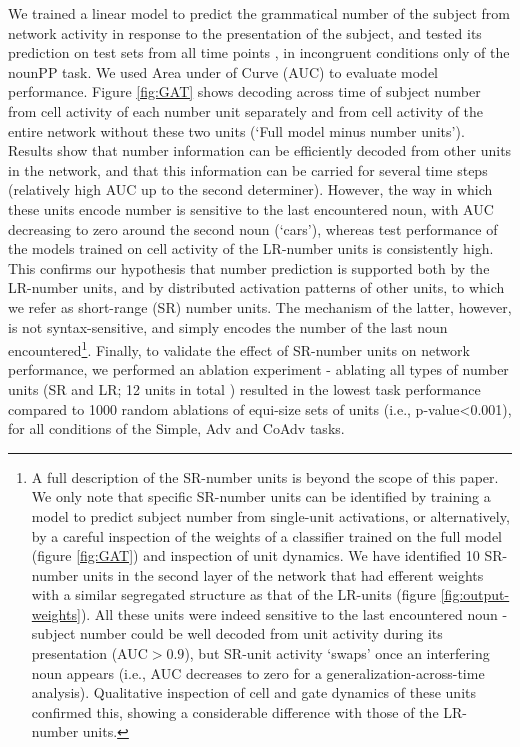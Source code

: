 We trained a linear model to predict the grammatical number of the
subject from network activity in response to the presentation of the
subject, and tested its prediction on test sets from all time points
, in incongruent conditions
only of the nounPP task.  We used Area under of Curve (AUC) to evaluate model
performance. Figure \ref{fig:GAT} shows decoding across time of
subject number from cell activity of each number unit separately and
from cell activity of the entire network without these two units
(`Full model minus number units'). Results show that number
information can be efficiently decoded from other units in the
network, and that this information can be carried for several time
steps (relatively high AUC up to the second determiner). However, the
way in which these units encode number is sensitive to the last
encountered noun, with AUC decreasing to zero around the second noun
(`cars'), whereas test performance of the models trained on cell activity of the LR-number units is consistently high. This confirms our
hypothesis that number prediction is supported both by the LR-number
units, and by distributed activation patterns of other units, to which we refer as short-range (SR) number units. The
mechanism of the latter, however, is not syntax-sensitive, and simply encodes
the number of the last noun encountered\footnote{A full description of the SR-number units is beyond the scope of this paper. We only note that specific SR-number units can be identified by training a model to predict subject number from single-unit activations, or alternatively, by a careful inspection of the weights of a classifier trained on the full model (figure \ref{fig:GAT}) and inspection of unit dynamics. We have identified 10 SR-number units in the second layer of the network that had efferent weights with a similar segregated structure as that of the LR-units (figure \ref{fig:output-weights}). All these units were indeed sensitive to the last encountered noun - subject number could be well decoded from unit activity during its presentation (AUC$>0.9$), but SR-unit activity `swaps' once an interfering noun appears (i.e., AUC decreases to zero for a generalization-across-time analysis). Qualitative inspection of cell and gate dynamics of these units confirmed this, showing a considerable difference with those of the LR-number units.}. Finally, to validate the effect of SR-number units on network performance, we performed an ablation experiment - ablating all types of number units (SR and LR; 12 units in total ) resulted in the lowest task performance compared to 1000 random ablations of equi-size sets of units (i.e., p-value<0.001), for all conditions of the Simple, Adv and CoAdv tasks. 
